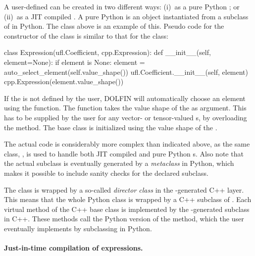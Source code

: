 A user-defined  can be created in two different ways:
(i)~as a pure Python ; or (ii)~as a JIT compiled
. A pure Python  is an object instantiated
from a subclass of  in Python. The  class
above is an example of this. Pseudo code for the constructor of the
 class is similar to that for the  class:
\begin{python}
class Expression(ufl.Coefficient, cpp.Expression):
    def __init__(self, element=None):
        if element is None:
            element = auto_select_element(self.value_shape())
        ufl.Coefficient.__init__(self, element)
        cpp.Expression(element.value_shape())
\end{python}
If the  is not defined by the user, DOLFIN will
automatically choose an element using the 
function. The function takes the value shape of the 
as argument. This has to be supplied by the user for any vector- or
tensor-valued s, by overloading the 
method. The base class  is initialized using the
value shape of the .

The actual code is considerably more complex than indicated above, as
the same class, , is used to handle both JIT compiled
and pure Python s. Also note that the actual subclass
is eventually generated by a \emph{metaclass} in Python, which makes it
possible to include sanity checks for the declared subclass.

The  class is wrapped by a so-called \emph{director class} in
the \swig-generated C++ layer. This means that the whole Python class is
wrapped by a C++ subclass of . Each virtual method
of the C++ base class is implemented by the \swig-generated subclass in
C++. These methods call the Python version of the method, which the user
eventually implements by subclassing  in Python.

\paragraph{Just-in-time compilation of expressions.}

